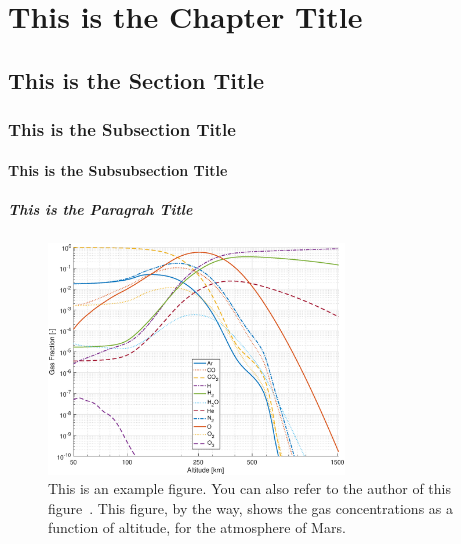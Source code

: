 \chapter{This is the Chapter Title}\label{ch:chapter}
\setcounter{page}{1}

\section{This is the Section Title}\label{sec:section}

\subsection{This is the Subsection Title}\label{subsec:subsection}

\subsubsection{This is the Subsubsection Title}

\paragraph{This is the Paragrah Title}

\begin{figure}[b!]
	\centering
	\includegraphics[width=0.7\textwidth]{figures/composition}
	\caption[This is an example figure. You can also refer to the author of this figure.]{This is an example figure. You can also refer to the author of this figure~\citep{MST001}. This figure, by the way, shows the gas concentrations as a function of altitude, for the atmosphere of Mars.}
	\label{fig:figure}
\end{figure}
